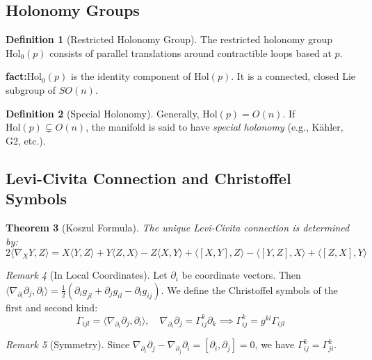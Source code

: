 \documentclass[11pt, a4paper]{article}
\theoremstyle{plain}
\newtheorem{theorem}{Theorem}[section]
\theoremstyle{definition}
\newtheorem{definition}[theorem]{Definition}
\theoremstyle{remark}
\newtheorem{remark}[theorem]{Remark}
\begin{document}
\subsection{Holonomy Groups}

\begin{definition}[Restricted Holonomy Group]
The restricted holonomy group $\text{Hol}_0(p)$ consists of parallel translations around contractible loops based at $p$.
\end{definition}


\noindent\textbf{fact:}$\text{Hol}_0(p)$ is the identity component of $\text{Hol}(p)$. It is a connected, closed Lie subgroup of $SO(n)$.


\begin{definition}[Special Holonomy]
Generally, $\text{Hol}(p) = O(n)$. If $\text{Hol}(p) \subsetneq O(n)$, the manifold is said to have \textit{special holonomy} (e.g., K\"ahler, G2, etc.).
\end{definition}

\subsection{Levi-Civita Connection and Christoffel Symbols}

\begin{theorem}[Koszul Formula]
The unique Levi-Civita connection is determined by:
\[ 2\langle \nabla_X Y, Z \rangle = X\langle Y, Z \rangle + Y\langle Z, X \rangle - Z\langle X, Y \rangle + \langle [X, Y], Z \rangle - \langle [Y, Z], X \rangle + \langle [Z, X], Y \rangle \]
\end{theorem}

\begin{remark}[In Local Coordinates]
Let $\partial_i$ be coordinate vectors. Then $\langle \nabla_{\partial_i} \partial_j, \partial_l \rangle = \frac{1}{2}(\partial_i g_{jl} + \partial_j g_{il} - \partial_l g_{ij})$.
We define the Christoffel symbols of the first and second kind:
\[ \Gamma_{ijl} = \langle \nabla_{\partial_i} \partial_j, \partial_l \rangle, \quad \nabla_{\partial_i} \partial_j = \Gamma_{ij}^k \partial_k \implies \Gamma_{ij}^k = g^{kl} \Gamma_{ijl} \]
\end{remark}

\begin{remark}[Symmetry]
Since $\nabla_{\partial_i} \partial_j - \nabla_{\partial_j} \partial_i = [\partial_i, \partial_j] = 0$, we have $\Gamma_{ij}^k = \Gamma_{ji}^k$.
\end{remark}
\end{document}
